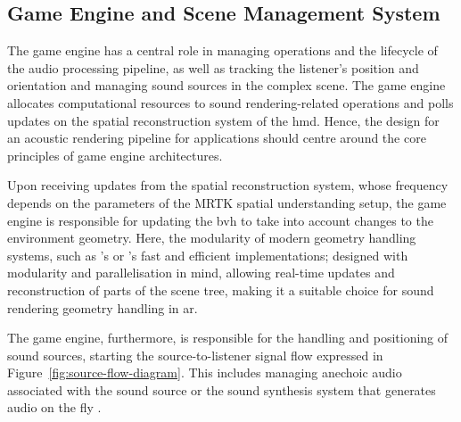 \subsection{Game Engine and Scene Management System}
The game engine has a central role in managing operations and the lifecycle of the audio processing pipeline, as well as tracking the listener's position and orientation and managing sound sources in the complex scene. The game engine allocates computational resources to sound rendering-related operations and polls updates on the spatial reconstruction system of the \acrshort{hmd}. Hence, the design for an acoustic rendering pipeline for applications should centre around the core principles of game engine architectures.\par
Upon receiving updates from the spatial reconstruction system, whose frequency depends on the parameters of the MRTK spatial understanding setup, the game engine is responsible for updating the \acrshort{bvh} to take into account changes to the environment geometry. Here, the modularity of modern geometry handling systems, such as \cite{kopta2012fast}'s or \cite{lauterbach2009fast}'s fast and efficient implementations; designed with modularity and parallelisation in mind, allowing real-time updates and reconstruction of parts of the scene tree, making it a suitable choice for sound rendering geometry handling in \acrshort{ar}.\par
The game engine, furthermore, is responsible for the handling and positioning of sound sources, starting the source-to-listener signal flow expressed in Figure~\ref{fig:source-flow-diagram}. This includes managing anechoic audio associated with the sound source or the sound synthesis system that generates audio on the fly \citep{hamid2009review}.\par

